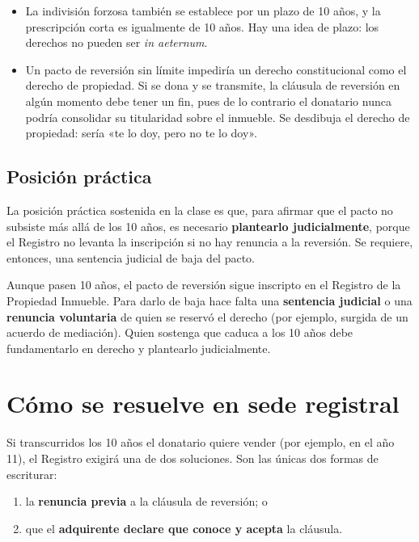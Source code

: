\documentclass[12pt,oneside]{book}
\begin{document}
\begin{itemize}
    \item La indivisión forzosa también se establece por un plazo de 10 años, y la prescripción corta es igualmente de 10 años. Hay una idea de plazo: los derechos no pueden ser \textit{in aeternum}.
    \item Un pacto de reversión sin límite impediría un derecho constitucional como el derecho de propiedad. Si se dona y se transmite, la cláusula de reversión en algún momento debe tener un fin, pues de lo contrario el donatario nunca podría consolidar su titularidad sobre el inmueble. Se desdibuja el derecho de propiedad: sería «te lo doy, pero no te lo doy».
\end{itemize}

\subsection{Posición práctica}

La posición práctica sostenida en la clase es que, para afirmar que el pacto no subsiste más allá de los 10 años, es necesario \textbf{plantearlo judicialmente}, porque el Registro no levanta la inscripción si no hay renuncia a la reversión. Se requiere, entonces, una sentencia judicial de baja del pacto.

\begin{important}
Aunque pasen 10 años, el pacto de reversión sigue inscripto en el Registro de la Propiedad Inmueble. Para darlo de baja hace falta una \textbf{sentencia judicial} o una \textbf{renuncia voluntaria} de quien se reservó el derecho (por ejemplo, surgida de un acuerdo de mediación). Quien sostenga que caduca a los 10 años debe fundamentarlo en derecho y plantearlo judicialmente.
\end{important}

\section{Cómo se resuelve en sede registral}

Si transcurridos los 10 años el donatario quiere vender (por ejemplo, en el año 11), el Registro exigirá una de dos soluciones. Son las únicas dos formas de escriturar:

\begin{enumerate}
    \item la \textbf{renuncia previa} a la cláusula de reversión; o
    \item que el \textbf{adquirente declare que conoce y acepta} la cláusula.
\end{enumerate}
\end{document}
